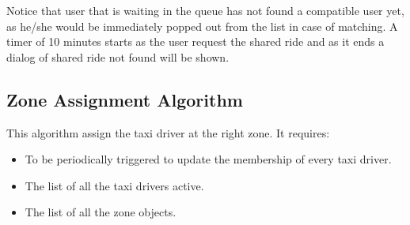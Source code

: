 Notice that user that is waiting in the queue has not found a compatible user yet, as he/she would be immediately popped out from the list in case of matching.
A timer of 10 minutes starts as the user request the shared ride and as it ends a dialog of shared ride not found will be shown.





\subsection{Zone Assignment Algorithm} %
\label{sub:third_algorithm}
This algorithm assign the taxi driver at the right zone.
It requires:
\begin{itemize}
	\item To be periodically triggered to update the membership of every taxi driver.
	\item The list of all the taxi drivers active.
	\item The list of all the zone objects.
\end{itemize}







